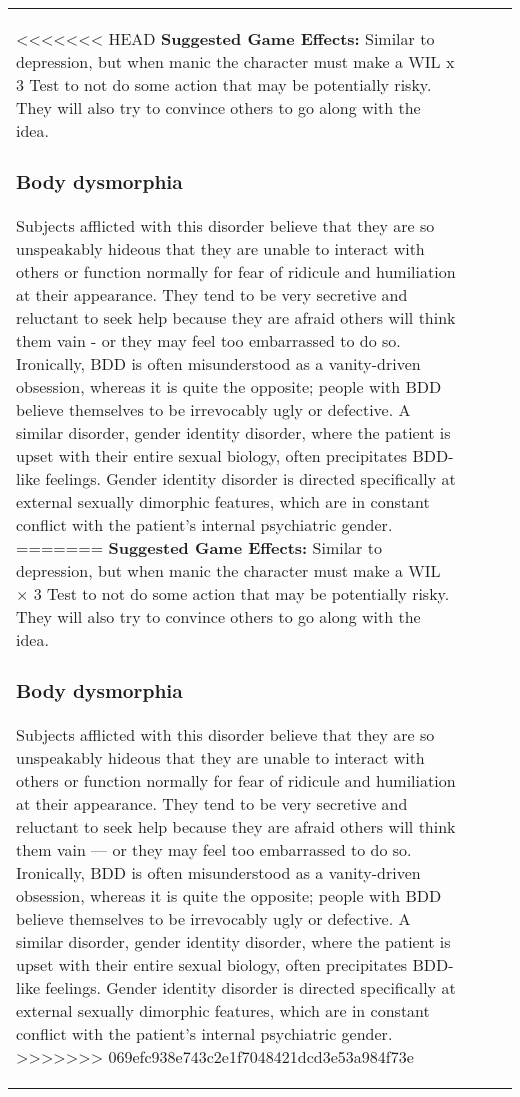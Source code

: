 \begin{table}
\begin{tabular}{|p{8cm}|r|r|r|}
<<<<<<< HEAD \textbf{Suggested Game Effects:} Similar to depression, but when manic the character must make a WIL x 3 Test to not do some action that may be potentially risky. They will also try to convince others to go along with the idea. 

\subsubsection{Body dysmorphia} 

Subjects afflicted with this disorder believe that they are so unspeakably hideous that they are unable to interact with others or function normally for fear of ridicule and humiliation at their appearance. They tend to be very secretive and reluctant to seek help because they are afraid others will think them vain - or they may feel too embarrassed to do so. Ironically, BDD is often misunderstood as a vanity-driven obsession, whereas it is quite the opposite; people with BDD believe themselves to be irrevocably ugly or defective. A similar disorder, gender identity disorder, where the patient is upset with their entire sexual biology, often precipitates BDD-like feelings. Gender identity disorder is directed specifically at external sexually dimorphic features, which are in constant conflict with the patient’s internal psychiatric gender. ======= \textbf{Suggested Game Effects:} Similar to depression, but when manic the character must make a WIL $\times$ 3 Test to not do some action that may be potentially risky. They will also try to convince others to go along with the idea. 

\subsubsection{Body dysmorphia} 

Subjects afflicted with this disorder believe that they are so unspeakably hideous that they are unable to interact with others or function normally for fear of ridicule and humiliation at their appearance. They tend to be very secretive and reluctant to seek help because they are afraid others will think them vain --- or they may feel too embarrassed to do so. Ironically, BDD is often misunderstood as a vanity-driven obsession, whereas it is quite the opposite; people with BDD believe themselves to be irrevocably ugly or defective. A similar disorder, gender identity disorder, where the patient is upset with their entire sexual biology, often precipitates BDD-like feelings. Gender identity disorder is directed specifically at external sexually dimorphic features, which are in constant conflict with the patient’s internal psychiatric gender. >>>>>>> 069efc938e743c2e1f7048421dcd3e53a984f73e 


\end{tabular}
\end{table}

